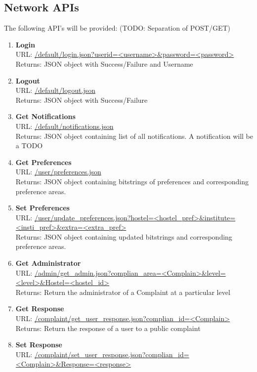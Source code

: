 \documentclass{article}
\begin{document}
			\subsection{Network APIs}
				The following API's will be provided:
				(TODO: Separation of POST/GET)
				\begin{enumerate}
					\item \textbf{Login} \\
						URL: \url{/default/login.json?userid=<username>&password=<password>}  \\
						Returns: JSON object with Success/Failure and Username
					\item \textbf{Logout} \\
						URL: \url{/default/logout.json} \\
						Returns: JSON object with Success/Failure
					\item \textbf{Get Notifications} \\
						URL: \url{/default/notifications.json} \\
						Returns: JSON object containing list of all notifications. 
						A notification will be a TODO 
					\item \textbf{Get Preferences} \\
						URL: \url{/user/preferences.json} \\
						Returns: JSON object containing bitstrings of preferences and corresponding preference areas.
					\item \textbf{Set Preferences} \\
						URL: \url{/user/update_preferences.json?hostel=<hostel_pref>&institute=<insti_pref>&extra=<extra_pref>} \\
						Returns:  JSON object containing updated bitstrings and corresponding preference areas.
					\item \textbf{Get Administrator} \\
						URL: \url{/admin/get_admin.json?complian_area=<Complain>&level=<level>&Hostel=<hostel_id>}\\
						Returns:  Return the administrator of a Complaint at a particular level
					\item \textbf{Get Response} \\
						URL: \url{/complaint/get_user_response.json?complian_id=<Complain>}\\
						Returns:  Return the response of a user to a public complaint 
					\item \textbf{Set Response} \\
						URL: \url{/complaint/set_user_response.json?complian_id=<Complain>&Response=<response>}\\

\end{enumerate}
\end{document}
